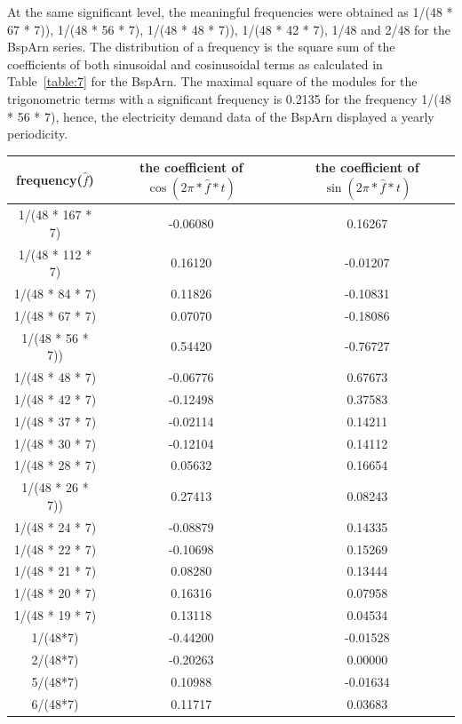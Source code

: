 \documentclass[12pt,msc]{uom_eee_dissertation_casson}
\newcommand{\tabref}[1]{Table~\ref{#1}}
\begin{document}
At the same significant level, the meaningful frequencies were obtained as 1/(48 * 67 * 7)), 1/(48 * 56 * 7), 1/(48 * 48 * 7)), 1/(48 * 42 * 7), 1/48 and 2/48 for the BspArn series. The distribution of a frequency is the square sum of the coefficients of both sinusoidal and cosinusoidal terms as calculated in \tabref{table:7} for the BspArn. The maximal square of the modules for the trigonometric terms with a significant frequency is 0.2135 for the frequency 1/(48 * 56 * 7), hence, the electricity demand data of the BspArn displayed a yearly periodicity.

\begin{table}
\centering
\begin{tabular}{| c | c | c | }
		\hline
		 frequency($\hat{f}$)& the coefficient of $\cos(2\pi *\hat{f}*t)$  & the coefficient of $\sin(2\pi *\hat{f}*t)$  \\ \hline
1/(48 * 167 * 7) & -0.06080& 0.16267\\ \hline
1/(48 * 112 * 7) &  0.16120& -0.01207 \\ \hline
1/(48 * 84 * 7)  &  0.11826&-0.10831\\ \hline
1/(48 * 67 * 7)  &  0.07070&-0.18086\\ \hline
1/(48 * 56 * 7)) &  0.54420&-0.76727\\ \hline
1/(48 * 48 * 7)  & -0.06776& 0.67673 \\ \hline
1/(48 * 42 * 7)  & -0.12498& 0.37583\\ \hline
1/(48 * 37 * 7)  & -0.02114& 0.14211 \\ \hline
1/(48 * 30 * 7)  & -0.12104& 0.14112 \\ \hline
1/(48 * 28 * 7)  &  0.05632& 0.16654\\ \hline
1/(48 * 26 * 7)) &  0.27413& 0.08243\\ \hline
1/(48 * 24 * 7)  & -0.08879& 0.14335\\ \hline
1/(48 * 22 * 7)  & -0.10698& 0.15269 \\ \hline
1/(48 * 21 * 7)  &  0.08280& 0.13444\\ \hline
1/(48 * 20 * 7)  &  0.16316& 0.07958 \\ \hline
1/(48 * 19 * 7)  &  0.13118& 0.04534\\ \hline
1/(48*7)         & -0.44200&-0.01528\\ \hline
2/(48*7)         & -0.20263& 0.00000\\ \hline
5/(48*7)         &  0.10988&-0.01634\\ \hline
6/(48*7)         &  0.11717& 0.03683\\ \hline

\end{tabular}
\end{table}
\end{document}
